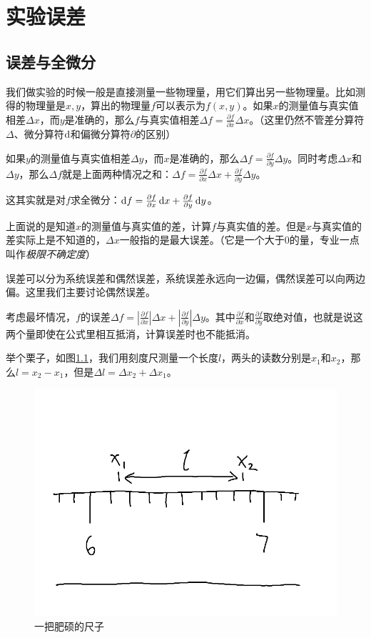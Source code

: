 \chapter{实验误差}
\section{误差与全微分}
我们做实验的时候一般是直接测量一些物理量，用它们算出另一些物理量。比如测得的物理量是$x,y$，算出的物理量$f$可以表示为$f(x,y)$。如果$x$的测量值与真实值相差$\Delta x$，而$y$是准确的，那么$f$与真实值相差$\Delta f=\frac{\partial f}{\partial x} \Delta x$。（这里仍然不管差分算符$\Delta$、微分算符$\mathop{}\!\mathrm{d}$和偏微分算符$\partial$的区别）

如果$y$的测量值与真实值相差$\Delta y$，而$x$是准确的，那么$\Delta f=\frac{\partial f}{\partial y} \Delta y$。同时考虑$\Delta x$和$\Delta y$，那么$\Delta f$就是上面两种情况之和：$\Delta f=\frac{\partial f}{\partial x} \Delta x+\frac{\partial f}{\partial y} \Delta y$。

这其实就是对$f$求全微分：$\mathop{}\!\mathrm{d} f=\frac{\partial f}{\partial x} \mathop{}\!\mathrm{d} x+\frac{\partial f}{\partial y} \mathop{}\!\mathrm{d} y$。

上面说的是知道$x$的测量值与真实值的差，计算$f$与真实值的差。但是$x$与真实值的差实际上是不知道的，$\Delta x$一般指的是最大误差。（它是一个大于$0$的量，专业一点叫作\emph{极限不确定度}）

误差可以分为系统误差和偶然误差，系统误差永远向一边偏，偶然误差可以向两边偏。这里我们主要讨论偶然误差。

考虑最坏情况，$f$的误差$\Delta f=|\frac{\partial f}{\partial x}| \Delta x+|\frac{\partial f}{\partial y}| \Delta y$。其中$\frac{\partial f}{\partial x}$和$\frac{\partial f}{\partial y}$取绝对值，也就是说这两个量即使在公式里相互抵消，计算误差时也不能抵消。

举个栗子，如图\ref{fig-length-diff}，我们用刻度尺测量一个长度$l$，两头的读数分别是$x_1$和$x_2$，那么$l=x_2-x_1$，但是$\Delta l=\Delta x_2+\Delta x_1$。
\begin{figure}[htb]
\centering
\includegraphics[scale=0.5]{fig/length-diff.png}
\caption{一把肥硕的尺子}
\label{fig-length-diff}
\end{figure}

